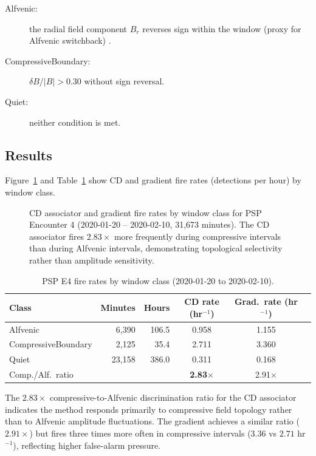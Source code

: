 \documentclass[draft]{agujournal2025}
\let\citep\cite%
\begin{document}
\begin{description}
  \item[Alfvenic:] the radial field component $B_r$ reverses sign within the
    window (proxy for Alfvenic switchback) \citep{dudokdewit2020}.
  \item[CompressiveBoundary:] $\delta B / |B| > 0.30$ without sign reversal.
  \item[Quiet:] neither condition is met.
\end{description}

\subsection{Results}

Figure~\ref{fig:alfven_control} and Table~\ref{tab:alfven_control} show CD
and gradient fire rates (detections per hour) by window class.

\begin{figure}[htbp]
  \centering
  
  \caption{CD associator and gradient fire rates by window class for PSP
    Encounter 4 (2020-01-20 -- 2020-02-10, 31{,}673 minutes).
    The CD associator fires $2.83\times$ more frequently during compressive
    intervals than during Alfvenic intervals, demonstrating topological
    selectivity rather than amplitude sensitivity.}
  \label{fig:alfven_control}
\end{figure}

\begin{table}[htbp]
  \centering
  \caption{PSP E4 fire rates by window class (2020-01-20 to 2020-02-10).}
  \label{tab:alfven_control}
  \begin{tabular}{lrrccc}
    \toprule
    Class & Minutes & Hours & CD rate (hr$^{-1}$) & Grad.\ rate (hr$^{-1}$) \\
    \midrule
    Alfvenic            &  6{,}390 & 106.5 & 0.958 & 1.155 \\
    CompressiveBoundary &  2{,}125 &  35.4 & 2.711 & 3.360 \\
    Quiet               & 23{,}158 & 386.0 & 0.311 & 0.168 \\
    \midrule
    Comp./Alf.\ ratio   &         &       & \textbf{2.83$\times$} & 2.91$\times$ \\
    \bottomrule
  \end{tabular}
\end{table}

The $2.83\times$ compressive-to-Alfvenic discrimination ratio for the CD
associator indicates the method responds primarily to compressive field
topology rather than to Alfvenic amplitude fluctuations.  The gradient
achieves a similar ratio ($2.91\times$) but fires three times more often
in compressive intervals ($3.36$ vs $2.71$ hr$^{-1}$), reflecting higher
false-alarm pressure.
\end{document}
